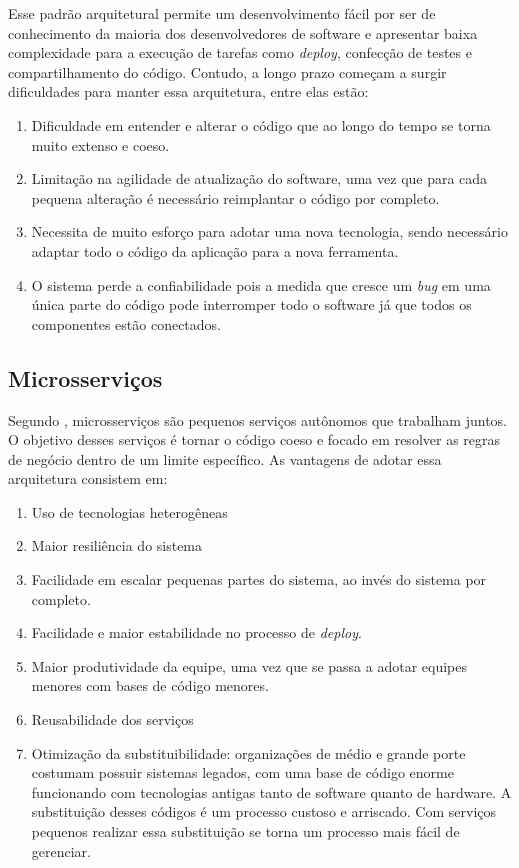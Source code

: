 Esse padrão arquitetural permite um desenvolvimento fácil por ser de conhecimento
da maioria dos desenvolvedores de software e apresentar baixa complexidade para a
execução de tarefas como \textit{deploy}, confecção de testes e compartilhamento
do código. Contudo, a longo prazo começam a surgir dificuldades para manter essa
arquitetura, entre elas estão:

  \begin{enumerate}
    \item Dificuldade em entender e alterar o código que ao longo do tempo se torna
    muito extenso e coeso.
    \item Limitação na agilidade de atualização do software, uma vez que para cada
    pequena alteração é necessário reimplantar o código por completo.
    \item Necessita de muito esforço para adotar uma nova tecnologia, sendo
    necessário adaptar todo o código da aplicação para a nova ferramenta.
    \item O sistema perde a confiabilidade pois a medida que cresce um \textit{bug}
    em uma única parte do código pode interromper todo o software já que todos os
    componentes estão conectados.
  \end{enumerate}

\subsection{Microsserviços}

Segundo , microsserviços são pequenos serviços autônomos que
trabalham juntos. O objetivo desses serviços é tornar o código coeso e focado em
resolver as regras de negócio dentro de um limite específico. As vantagens de adotar
essa arquitetura consistem em:

\begin{enumerate}
    \item{Uso de tecnologias heterogêneas}
    \item{Maior resiliência do sistema}
    \item{Facilidade em escalar pequenas partes do sistema, ao invés do sistema por
    completo.}
    \item{Facilidade e maior estabilidade no processo de \textit{deploy}.}
    \item{Maior produtividade da equipe, uma vez que se passa a adotar equipes
    menores com bases de código menores.}
    \item{Reusabilidade dos serviços}
    \item{Otimização da substituibilidade: organizações de médio e grande porte costumam
    possuir sistemas legados, com uma base de código enorme funcionando com tecnologias
    antigas tanto de software quanto de hardware. A substituição desses códigos é um
    processo custoso e arriscado. Com serviços pequenos realizar essa substituição
    se torna um processo mais fácil de gerenciar.}
\end{enumerate}

